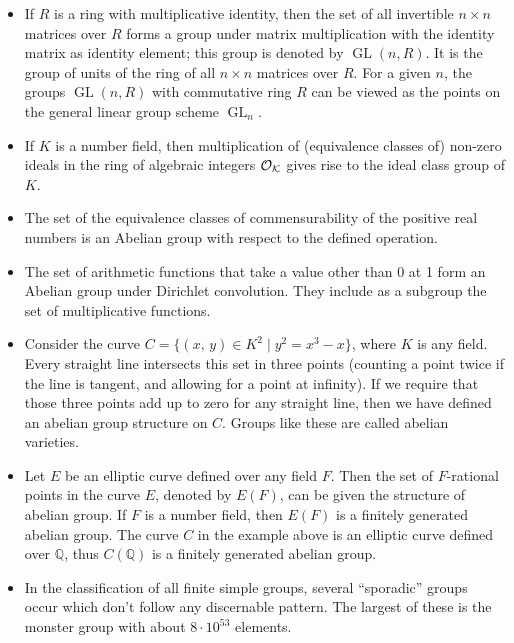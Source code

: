 \documentclass[12pt]{article}
\begin{document}
\begin{itemize}
\item If $R$ is a ring with multiplicative identity, then the set of all invertible $n\times n$ matrices over $R$
forms a group under matrix multiplication with the identity matrix as identity element; this group is denoted by $\operatorname{GL}(n,R)$. It is the group of units of the ring of all $n\times n$ matrices over $R$.  For a given $n$, the groups $\operatorname{GL}(n,R)$ with commutative ring $R$ can be viewed as the points on the general linear group scheme $\operatorname{GL}_n$.

\item If $K$ is a number field, then multiplication of (equivalence classes of) non-zero ideals in the ring of algebraic integers $\cal{O}_K$ gives rise to the ideal class group of $K$.

\item The set of the equivalence classes of commensurability of the positive real numbers is an Abelian group with respect to the defined operation.

\item
The set of arithmetic functions that take a value other than 0 at 1 form an Abelian group under Dirichlet convolution.  They include as a subgroup the set of multiplicative functions.

\item Consider the curve $C=\{(x,\,y)\in K^2\mid y^2=x^3-x\}$, where $K$ is any field. Every straight line intersects this set in three points (counting a point twice if the line is tangent, and allowing for a point at infinity). If we require that those three points add up to zero for any straight line, then we have defined an abelian group structure on $C$. Groups like these are called abelian varieties.

\item Let $E$ be an elliptic curve defined over any field $F$. Then the set of $F$-rational points in the curve $E$, denoted by $E(F)$, can be given the structure of abelian group. If $F$ is a number field, then $E(F)$ is a finitely generated abelian group. The curve $C$ in the example above is an elliptic curve defined over $\mathbb{Q}$, thus $C(\mathbb{Q})$ is a finitely generated abelian group.

\item In the classification of all finite simple groups, several
``sporadic'' groups occur which don't follow any discernable pattern.
The largest of these is the monster group with about $ 8\cdot 10^{53} $
elements.

\end{itemize}
\end{document}
